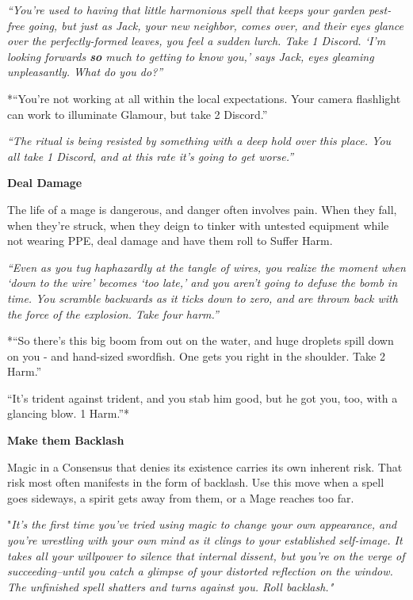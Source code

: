 \documentclass[
  oneside,
  statementpaper,
  9pt]{memoir}
\begin{document}
\emph{``You're used to having that little harmonious spell that keeps
your garden pest-free going, but just as Jack, your new neighbor, comes
over, and their eyes glance over the perfectly-formed leaves, you feel a
sudden lurch. Take 1 Discord. `I'm looking forwards
\textbf{\emph{\emph{so}}} much to getting to know you,' says Jack, eyes
gleaming unpleasantly. What do you do?''}

*``You're not working at all within the local expectations. Your camera
flashlight can work to illuminate Glamour, but take 2 Discord.''

\emph{``The ritual is being resisted by something with a deep hold over
this place. You all take 1 Discord, and at this rate it's going to get
worse.''}

\textbf{Deal Damage}

The life of a mage is dangerous, and danger often involves pain. When
they fall, when they're struck, when they deign to tinker with untested
equipment while not wearing PPE, deal damage and have them roll to
Suffer Harm.

\emph{``Even as you tug haphazardly at the tangle of wires, you realize
the moment when `down to the wire' becomes `too late,' and you aren't
going to defuse the bomb in time. You scramble backwards as it ticks
down to zero, and are thrown back with the force of the explosion. Take
four harm.''}

*``So there's this big boom from out on the water, and huge droplets
spill down on you - and hand-sized swordfish. One gets you right in the
shoulder. Take 2 Harm.''

``It's trident against trident, and you stab him good, but he got you,
too, with a glancing blow. 1 Harm.''*

\textbf{Make them Backlash}

Magic in a Consensus that denies its existence carries its own inherent
risk. That risk most often manifests in the form of backlash. Use this
move when a spell goes sideways, a spirit gets away from them, or a Mage
reaches too far.

"\emph{It's the first time you've tried using magic to change your own
appearance, and you're wrestling with your own mind as it clings to your
established self-image. It takes all your willpower to silence that
internal dissent, but you're on the verge of succeeding--until you catch
a glimpse of your distorted reflection on the window. The unfinished
spell shatters and turns against you. Roll backlash."}
\end{document}
